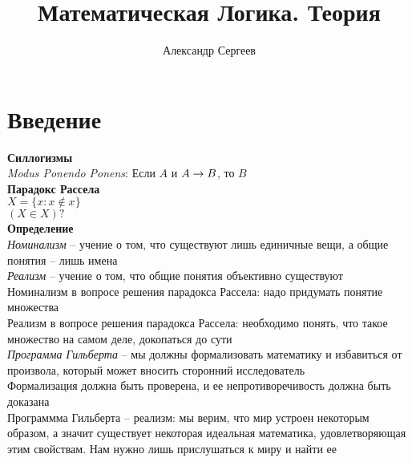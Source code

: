 \documentclass[12pt]{article}
\title{Математическая Логика. Теория}
\author{Александр Сергеев}
\date{}
\begin{document}
\maketitle
\section{Введение}
\textbf{Силлогизмы}\\
\textit{Modus Ponendo Ponens}: Если $A$ и $A \rightarrow B$, то $B$\\
\textbf{Парадокс Рассела}\\
$X = \{x: x \not\in x\}$\\
$(X \in X)?$\\
\textbf{Определение}\\
\textit{Номинализм} -- учение о том, что существуют лишь единичные вещи, а общие понятия -- лишь имена\\
\textit{Реализм} -- учение о том, что общие понятия объективно существуют\\
Номинализм в вопросе решения парадокса Рассела: надо придумать понятие множества\\
Реализм в вопросе решения парадокса Рассела: необходимо понять, что такое множество на самом деле, докопаться до сути\\
\textit{Программа Гильберта} -- мы должны формализовать математику и избавиться от произвола, который может вносить сторонний исследователь\\
Формализация должна быть проверена, и ее непротиворечивость должна быть доказана\\
Программма Гильберта -- реализм: мы верим, что мир устроен некоторым образом, а значит существует некоторая идеальная математика, удовлетворяющая этим свойствам. Нам нужно лишь прислушаться к миру и найти ее
\end{document}
